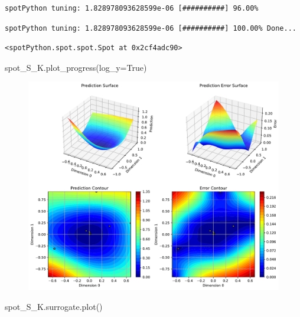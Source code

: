 \documentclass[
  letterpaper,
  DIV=11,
  numbers=noendperiod]{scrreprt}
\newenvironment{Shaded}{\begin{snugshade}}{\end{snugshade}}
\newcommand{\NormalTok}[1]{\textcolor[rgb]{0.00,0.23,0.31}{#1}}
\newcommand{\OperatorTok}[1]{\textcolor[rgb]{0.37,0.37,0.37}{#1}}
\newcommand{\VariableTok}[1]{\textcolor[rgb]{0.07,0.07,0.07}{#1}}
\begin{document}
\begin{verbatim}
spotPython tuning: 1.828978093628599e-06 [##########] 96.00% 
\end{verbatim}

\begin{verbatim}
spotPython tuning: 1.828978093628599e-06 [##########] 100.00% Done...
\end{verbatim}

\begin{verbatim}
<spotPython.spot.spot.Spot at 0x2cf4adc90>
\end{verbatim}

\begin{Shaded}
\begin{Highlighting}[]
\NormalTok{spot\_S\_K.plot\_progress(log\_y}\OperatorTok{=}\VariableTok{True}\NormalTok{)}
\end{Highlighting}
\end{Shaded}

\begin{figure}[H]

{\centering \includegraphics{012_num_spot_ei_files/figure-pdf/cell-40-output-1.pdf}

}

\end{figure}

\begin{Shaded}
\begin{Highlighting}[]
\NormalTok{spot\_S\_K.surrogate.plot()}
\end{Highlighting}
\end{Shaded}
\end{document}
